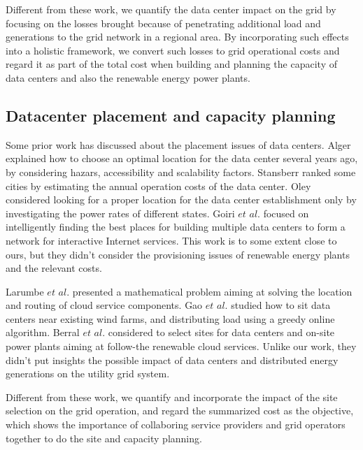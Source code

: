 Different from these work, we quantify the data center impact on the grid by focusing on the losses brought because of penetrating additional load and generations to the grid network in a regional area. By incorporating such effects into a holistic framework, we convert such losses to grid operational costs and regard it as part of the total cost when building and planning the capacity of data centers and also the renewable energy power plants.

\subsection{Datacenter placement and capacity planning}

Some prior work has discussed about the placement issues of data centers. Alger \cite{Dalger05} explained how to choose an optimal location for the data center several years ago, by considering hazars, accessibility and scalability factors. Stansberr \cite{Stansberr06} ranked some cities by estimating the annual operation costs of the data center. Oley \cite{Boley09} considered looking for a proper location for the data center establishment only by investigating the power rates of different states. 
Goiri $\textit{et al.}$ \cite{Goiri11place} focused on intelligently finding the best places for building multiple data centers to form a network for interactive Internet services. This work is to some extent close to ours, but they didn't consider the provisioning issues of renewable energy plants and the relevant costs.

Larumbe $\textit{et al.}$ \cite{larumbe2012optimal} presented a mathematical problem aiming at solving the location and routing of cloud service components. Gao $\textit{et al.}$ \cite{gao2013answer} studied how to sit data centers near existing wind farms, and distributing load using a greedy online algorithm. 
Berral $\textit{et al.}$ \cite{berral2014building} considered to select sites for data centers and on-site power plants aiming at follow-the renewable cloud services. Unlike our work, they didn't put insights the possible impact of data centers and distributed energy generations on the utility grid system. 

Different from these work, we quantify and incorporate the impact of the site selection on the grid operation, and regard the summarized cost as the objective, which shows the importance of collaboring service providers and grid operators together to do the site and capacity planning.

